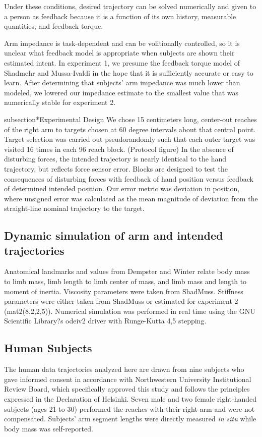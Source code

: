 \documentclass[letterpaper, 10 pt, conference]{ieeeconf}  %
\begin{document}
Under these conditions, desired trajectory can be solved numerically and given to a person as feedback because it is a function of its own history, measurable quantities, and feedback torque.

Arm impedance is task-dependent and can be volitionally controlled, so it is unclear what feedback model is appropriate when subjects are shown their estimated intent. In experiment 1, we presume the feedback torque model of Shadmehr and Mussa-Ivaldi in the hope that it is sufficiently accurate or easy to learn. After determining that subjects' arm impedance was much lower than modeled, we lowered our impedance estimate to the smallest value that was numerically stable for experiment 2.


subsection*{Experimental Design}
We chose 15 centimeters long, center-out reaches of the right arm to targets chosen at 60 degree intervals about that central point. Target selection was carried out pseudorandomly such that each outer target was visited 16 times in each 96 reach block. (Protocol figure) In the absence of disturbing forces, the intended trajectory is nearly identical to the hand trajectory, but reflects force sensor error. Blocks are designed to test the consequences of disturbing forces with feedback of hand position versus feedback of determined intended position. Our error metric was deviation in position, where unsigned error was calculated as the mean magnitude of deviation from the straight-line nominal trajectory to the target. 

\subsection*{Dynamic simulation of arm and intended trajectories}
Anatomical landmarks and values from Dempster \cite{dempster1955space} and Winter \cite{winter2009biomechanics} relate body mass to limb mass, limb length to limb center of mass, and limb mass and length to moment of inertia. Viscosity parameters were taken from ShadMuss. Stiffness parameters were either taken from ShadMuss or estimated for experiment 2 (mat2(8,2,2,5)). Numerical simulation was performed in real time using the GNU Scientific Library?s odeiv2 driver with Runge-Kutta 4,5 stepping.

\subsection*{Human Subjects}
The human data trajectories analyzed here are drawn from nine subjects who gave informed consent in accordance with Northwestern University Institutional Review Board, which specifically approved this study and follows the principles expressed in the Declaration of Helsinki. Seven male and two female right-handed subjects (ages 21 to 30) performed the reaches with their right arm and were not compensated. Subjects' arm segment lengths were directly measured \textit{in situ} while body mass was self-reported.
\end{document}
